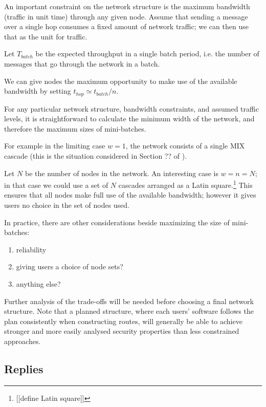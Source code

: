 \documentclass{llncs}
\begin{document}
An important constraint on the network structure is the maximum
bandwidth (traffic in unit time) through any given node.
Assume that sending a message over a single hop consumes a fixed
amount of network traffic; we can then use that as the unit for
traffic.

Let $T_{batch}$ be the expected throughput in a single batch period,
i.e. the number of messages that go through the network in a batch.

We can give nodes the maximum opportunity to make use of the available
bandwidth by setting $t_{hop} \simeq t_{batch}/n$.


For any particular network structure, bandwidth constraints, and
assumed traffic levels, it is straightforward to calculate the
minimum width of the network, and therefore the maximum sizes of
mini-batches.

For example in the limiting case $w = 1$, the network consists of a
single MIX cascade (this is the situation considered in Section ??
of \cite{babel}).

Let $N$ be the number of nodes in the network. An interesting case
is $w = n = N$; in that case we could use a set of $N$ cascades
arranged as a Latin square.\footnote{[[define Latin square]]}
This ensures that all nodes make full use of the available bandwidth;
however it gives users no choice in the set of nodes used.

In practice, there are other considerations beside maximizing the
size of mini-batches:

\begin{enumerate}
\item reliability
\item giving users a choice of node sets?
\item anything else?
\end{enumerate}

Further analysis of the trade-offs will be needed before choosing a
final network structure. Note that a planned structure, where each
users' software follows the plan consistently when constructing
routes, will generally be able to achieve stronger and more easily
analysed security properties than less constrained approaches.


\subsection{Replies}
\label{subsec:replies}
\end{document}
